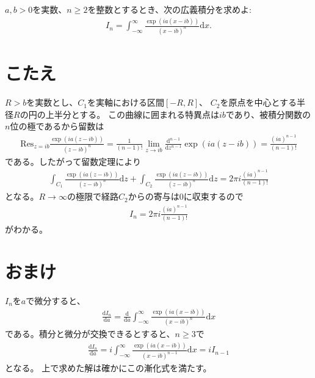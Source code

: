 \documentclass{jsarticle}
\def\diff{\textrm{d}}
\begin{document}
\section*{}
$a,b>0$を実数、$n\geq 2$を整数とするとき、次の広義積分を求めよ:
\begin{align*}
    I_{n}=\int_{-\infty}^{\infty}\frac{\exp(ia(x-ib))}{(x-ib)^{n}}\diff x.
\end{align*}

\section*{こたえ}
$R>b$を実数とし、$C_{1}$を実軸における区間$[-R,R]$、
$C_{2}$を原点を中心とする半径$R$の円の上半分とする。
この曲線に囲まれる特異点は$ib$であり、被積分関数の$n$位の極であるから留数は
\begin{align*}
    \mathrm{Res}_{z=ib}\frac{\exp(ia(z-ib))}{(z-ib)^{n}}
    =\frac{1}{(n-1)!}\lim_{z\to ib}\frac{\diff^{n-1}}{\diff z^{n-1}}\exp(ia(z-ib))=\frac{(ia)^{n-1}}{(n-1)!}
\end{align*}
である。したがって留数定理により
\begin{align*}
    \int_{C_{1}}\frac{\exp(ia(z-ib))}{(z-ib)^{n}}\diff z
    +\int_{C_{2}}\frac{\exp(ia(z-ib))}{(z-ib)^{n}}\diff z
    =2\pi i\frac{(ia)^{n-1}}{(n-1)!}
\end{align*}
となる。$R\to\infty$の極限で経路$C_{2}$からの寄与は$0$に収束するので
\begin{align*}
    I_{n}=2\pi i\frac{(ia)^{n-1}}{(n-1)!}
\end{align*}
がわかる。

\section*{おまけ}
$I_{n}$を$a$で微分すると、
\begin{align*}
    \frac{\diff I_{n}}{\diff a}=\frac{\diff}{\diff a}\int_{-\infty}^{\infty}\frac{\exp(ia(x-ib))}{(x-ib)^{n}}\diff x
\end{align*}
である。積分と微分が交換できるとすると、$n\geq 3$で
\begin{align*}
    \frac{\diff I_{n}}{\diff a}=i\int_{-\infty}^{\infty}\frac{\exp(ia(x-ib))}{(x-ib)^{n-1}}\diff x=iI_{n-1}
\end{align*}
となる。
上で求めた解は確かにこの漸化式を満たす。
\end{document}
